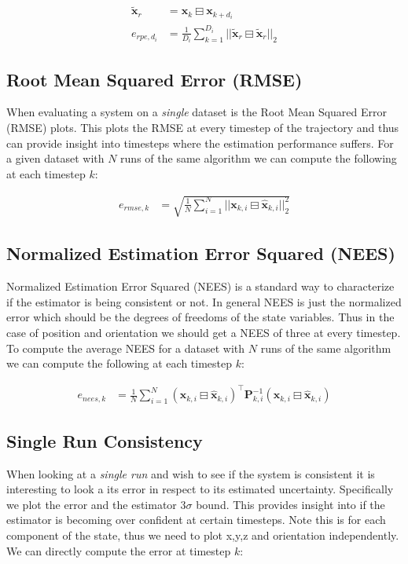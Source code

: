 \begin{align*} \tilde{\mathbf{x}}_{r} &= \mathbf{x}_{k} \boxminus \mathbf{x}_{k+d_i} \\ e_{rpe,d_i} &= \frac{1}{D_i} \sum_{k=1}^{D_i} ||\tilde{\mathbf{x}}_{r} \boxminus \hat{\tilde{\mathbf{x}}}_{r}||_{2} \end{align*}\hypertarget{eval-metrics_eval-rmse}{}\subsection{Root Mean Squared Error (\+R\+M\+S\+E)}\label{eval-metrics_eval-rmse}
When evaluating a system on a {\itshape single} dataset is the Root Mean Squared Error (R\+M\+SE) plots. This plots the R\+M\+SE at every timestep of the trajectory and thus can provide insight into timesteps where the estimation performance suffers. For a given dataset with $N$ runs of the same algorithm we can compute the following at each timestep $k$\+:

\begin{align*} e_{rmse,k} &= \sqrt{ \frac{1}{N} \sum_{i=1}^{N} ||\mathbf{x}_{k,i} \boxminus \hat{\mathbf{x}}_{k,i}||^2_{2} } \end{align*}\hypertarget{eval-metrics_eval-nees}{}\subsection{Normalized Estimation Error Squared (\+N\+E\+E\+S)}\label{eval-metrics_eval-nees}
Normalized Estimation Error Squared (N\+E\+ES) is a standard way to characterize if the estimator is being consistent or not. In general N\+E\+ES is just the normalized error which should be the degrees of freedoms of the state variables. Thus in the case of position and orientation we should get a N\+E\+ES of three at every timestep. To compute the average N\+E\+ES for a dataset with $N$ runs of the same algorithm we can compute the following at each timestep $k$\+:

\begin{align*} e_{nees,k} &= \frac{1}{N} \sum_{i=1}^{N} (\mathbf{x}_{k,i} \boxminus \hat{\mathbf{x}}_{k,i})^\top \mathbf{P}^{-1}_{k,i} (\mathbf{x}_{k,i} \boxminus \hat{\mathbf{x}}_{k,i}) \end{align*}\hypertarget{eval-metrics_eval-singlerun}{}\subsection{Single Run Consistency}\label{eval-metrics_eval-singlerun}
When looking at a {\itshape single run} and wish to see if the system is consistent it is interesting to look a its error in respect to its estimated uncertainty. Specifically we plot the error and the estimator $3\sigma$ bound. This provides insight into if the estimator is becoming over confident at certain timesteps. Note this is for each component of the state, thus we need to plot x,y,z and orientation independently. We can directly compute the error at timestep $k$\+:

